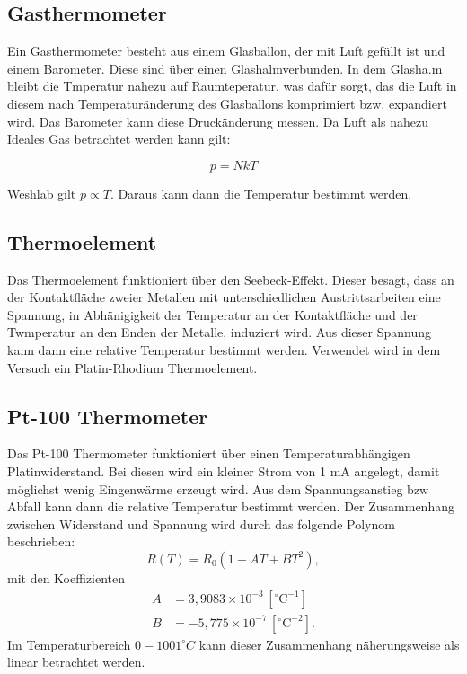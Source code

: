 \subsection{Gasthermometer}
Ein Gasthermometer besteht aus einem Glasballon, der mit Luft gefüllt ist und einem Barometer.
Diese sind über einen Glashalmverbunden. In dem Glasha.m bleibt die Tmperatur nahezu auf Raumteperatur,
was dafür sorgt, das die Luft in diesem nach Temperaturänderung des Glasballons komprimiert bzw. expandiert wird.
Das Barometer kann diese Druckänderung messen. Da Luft als nahezu Ideales Gas betrachtet werden kann gilt:

\begin{equation}
    p = NkT
\end{equation}

Weshlab gilt $p \propto T$. Daraus kann dann die Temperatur bestimmt werden.

\subsection{Thermoelement}
Das Thermoelement funktioniert über den Seebeck-Effekt. Dieser besagt,
dass an der Kontaktfläche zweier Metallen mit unterschiedlichen Austrittsarbeiten
eine Spannung, in Abhänigigkeit der Temperatur an der Kontaktfläche und der Twmperatur an den Enden der Metalle, induziert wird. 
Aus dieser Spannung kann dann eine relative Temperatur bestimmt werden.
Verwendet wird in dem Versuch ein Platin-Rhodium Thermoelement.

\subsection{Pt-100 Thermometer}
Das Pt-100 Thermometer funktioniert über einen Temperaturabhängigen Platinwiderstand.
Bei diesen wird ein kleiner Strom von 1 mA angelegt, damit möglichst wenig Eingenwärme erzeugt wird.
Aus dem Spannungsanstieg bzw Abfall kann dann die relative Temperatur bestimmt werden.
Der Zusammenhang zwischen Widerstand und Spannung wird durch das folgende Polynom beschrieben: 
\begin{equation}
    R(T) = R_{0} \left( 1 + A T + B T^{2} \right),
    \label{eq:Polynom}
\end{equation}
mit den Koeffizienten
\begin{align*}
    A &= 3{,}9083 \times 10^{-3}\,[^\circ\mathrm{C}^{-1}] \\
    B &= -5{,}775 \times 10^{-7}\,[^\circ\mathrm{C}^{-2}].
\end{align*}
Im Temperaturbereich $0-100 1^\circ C$ kann dieser Zusammenhang näherungsweise als linear betrachtet werden.

